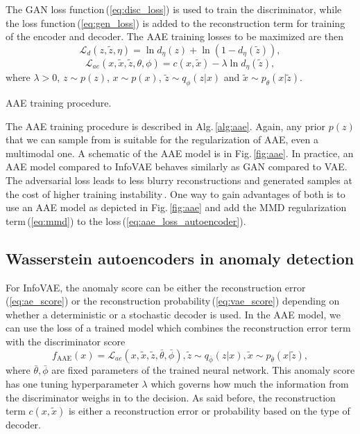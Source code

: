 The GAN loss function\,(\ref{eq:disc_loss}) is used to train the
discriminator, while the loss function\,(\ref{eq:gen_loss}) is added
to the reconstruction term for training of the encoder and decoder.
The AAE training losses to be maximized are then
\begin{equation}
\mathcal{L}_{d}(z,\tilde{z},\eta)=\ln d_{\eta}(z)+\ln(1-d_{\eta}(\tilde{z})),\label{eq:aae_loss_disc}
\end{equation}
\begin{equation}
\mathcal{L}_{ae}(x,\tilde{x},\tilde{z},\theta,\phi)=c(x,\tilde{x})-\lambda\ln d_{\eta}(\tilde{z}),\label{eq:aae_loss_autoencoder}
\end{equation}
where $\lambda>0$, $z\sim p(z)$, $x\sim p(x)$, $\tilde{z}\sim q_{\phi}(z|x)$
and $\tilde{x}\sim p_{\theta}(x|\tilde{z})$.

\begin{algorithm}


\caption{AAE training procedure.}
\label{alg:aae}
\end{algorithm}

The AAE training procedure is described in Alg.\,\ref{alg:aae}.
Again, any prior $p(z)$ that we can sample from is suitable for the
regularization of AAE, even a multimodal one. A schematic of the AAE
model is in Fig.\,\ref{fig:aae}. In practice, an AAE model compared
to InfoVAE behaves similarly as GAN compared to VAE. The adversarial
loss leads to less blurry reconstructions and generated samples at
the cost of higher training instability\,\cite{tolstikhin2017wasserstein}.
One way to gain advantages of both is to use an AAE model as depicted
in Fig.\,\ref{fig:aae} and add the MMD regularization term\,(\ref{eq:mmd})
to the loss\,(\ref{eq:aae_loss_autoencoder}).


\subsection{Wasserstein autoencoders in anomaly detection}

For InfoVAE, the anomaly score can be either the reconstruction error\,(\ref{eq:ae_score})
or the reconstruction probability\,(\ref{eq:vae_score}) depending
on whether a deterministic or a stochastic decoder is used. In the
AAE model, we can use the loss of a trained model which combines the
reconstruction error term with the discriminator score 
\begin{equation}
f_{\text{AAE}}(x)=\mathcal{L}_{ae}(x,\tilde{x},\tilde{z},\bar{\theta},\bar{\phi}),\tilde{z}\sim q_{\bar{\phi}}(z|x),\tilde{x}\sim p_{\bar{\theta}}(x|\tilde{z}),\label{eq:aae_score}
\end{equation}
where $\bar{\theta},\bar{\phi}$ are fixed parameters of the trained
neural network. This anomaly score has one tuning hyperparameter $\lambda$
which governs how much the information from the discriminator weighs
in to the decision. As said before, the reconstruction term $c(x,\tilde{x})$
is either a reconstruction error or probability based on the type
of decoder.

